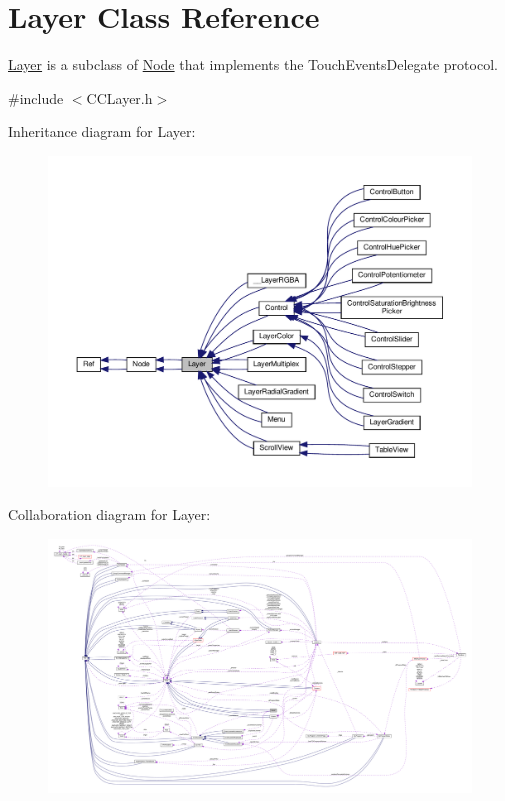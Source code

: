 \hypertarget{classLayer}{}\section{Layer Class Reference}
\label{classLayer}


\hyperlink{classLayer}{Layer} is a subclass of \hyperlink{classNode}{Node} that implements the Touch\+Events\+Delegate protocol.  




{\ttfamily \#include $<$C\+C\+Layer.\+h$>$}



Inheritance diagram for Layer\+:
\nopagebreak
\begin{figure}[H]
\begin{center}
\leavevmode
\includegraphics[width=350pt]{classLayer__inherit__graph}
\end{center}
\end{figure}


Collaboration diagram for Layer\+:
\nopagebreak
\begin{figure}[H]
\begin{center}
\leavevmode
\includegraphics[width=350pt]{classLayer__coll__graph}
\end{center}
\end{figure}
